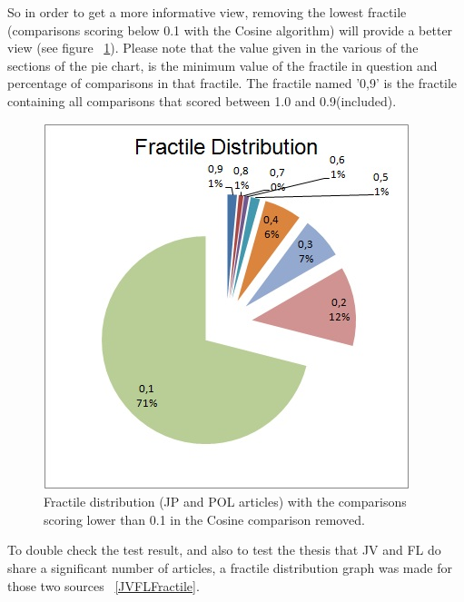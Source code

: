 So in order to get a more informative view, removing the lowest fractile (comparisons scoring below 0.1 with the Cosine algorithm) will provide a better view (see figure ~\ref{NoNoise}). Please note that the value given in the various of the sections of the pie chart, is the minimum value of the fractile in question and percentage of comparisons in that fractile. The fractile named '0,9' is the fractile containing all comparisons that scored between 1.0 and 0.9(included).

\begin{figure}
	\centering
	\includegraphics[scale=1.0]{figures/FractileNoNoise}
	\caption{Fractile distribution (JP and POL articles) with the comparisons scoring lower than 0.1 in the Cosine comparison removed.}
	\label{NoNoise}
\end{figure}

To double check the test result, and also to test the thesis that JV and FL do share a significant number of articles, a fractile distribution graph was made for those two sources ~\ref{JVFLFractile}.

